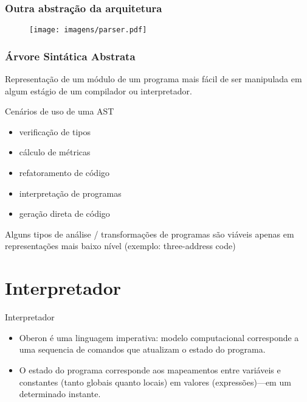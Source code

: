 \documentclass{beamer}
\begin{document}
\begin{frame}
  \frametitle{Outra abstra\c c\~{a}o da arquitetura}
  \begin{figure}
    \texttt{[image: imagens/parser.pdf]}
  \end{figure}
\end{frame}

\begin{frame}
  \frametitle{\'{A}rvore Sint\'{a}tica Abstrata}

  Representa\c c\~{a}o de um m\'{o}dulo de um
  programa mais f\'{a}cil de ser manipulada
  em algum est\'{a}gio de um compilador ou
  interpretador.

  \begin{block}{Cen\'{a}rios de uso de uma AST}
    \begin{itemize}
     \item verifica\c c\~{a}o de tipos
     \item c\'{a}lculo de m\'{e}tricas
     \item refatoramento de c\'{o}digo   
     \item interpreta\c c\~{a}o de programas
     \item gera\c c\~{a}o direta de c\'{o}digo  
    \end{itemize} 
  \end{block}  \pause

  Alguns tipos de an\'{a}lise / transforma\c c\~{o}es
  de programas s\~{a}o vi\'{a}veis apenas em
  representa\c c\~{o}es mais baixo n\'{i}vel
  (exemplo: three-address code)

\end{frame}

\section{Interpretador}

\begin{frame}
\huge{Interpretador}
\end{frame}

\begin{frame}
  \begin{itemize}
  \item Oberon \'{e} uma linguagem {\color{blue}imperativa}\pause: modelo
  computacional corresponde a uma sequencia de comandos
  que atualizam o {\color{blue}estado do programa}. \pause

  \item O estado do programa corresponde aos {\color{blue}mapeamentos} entre
  vari\'{a}veis e constantes (tanto globais quanto locais)
  em valores (express\~{o}es)\pause---em um determinado instante.
 \end{itemize} 
\end{frame}
\end{document}
